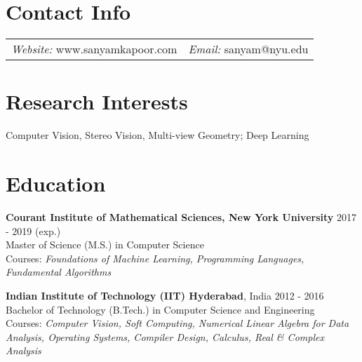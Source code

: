 \documentclass[margin,line]{res}
\begin{document}

\begin{resume}

\section{\sc Contact Info}

  \begin{tabular}{@{}p{2.9in}p{6in}}
	{\it Website:} www.sanyamkapoor.com & {\it Email:} sanyam@nyu.edu
  \end{tabular}

  \vspace*{-3.5mm}

\section{\sc Research Interests}
  Computer Vision, Stereo Vision, Multi-view Geometry; Deep Learning

\section{\sc Education}

  {\bf Courant Institute of Mathematical Sciences, New York University} \hfill 2017 - 2019 (exp.) \\
  	Master of Science (M.S.) in Computer Science \\
     Courses: \it{Foundations of Machine Learning, Programming Languages, Fundamental Algorithms}

  \vspace*{-3.5mm}

  {\bf Indian Institute of Technology (IIT) Hyderabad}, India \hfill 2012 - 2016 \\
  	Bachelor of Technology (B.Tech.) in Computer Science and Engineering \\
    Courses: \it{Computer Vision, Soft Computing, Numerical Linear Algebra for Data Analysis, Operating Systems, Compiler Design, Calculus, Real \& Complex Analysis}

  \vspace*{-3.5mm}

  \begin{comment}
  {\bf La Montessori School}, Kullu, HP, India \hfill 2010 - 2012 \\
	Intermediate (Physics, Mathematics, Chemistry),
    Percentage Score: 93.4\% ({\bf Rank 1})


\end{comment}
\end{resume}
\end{document}
